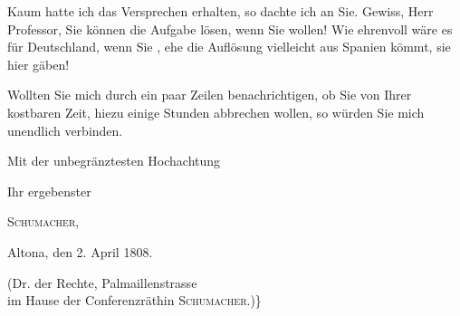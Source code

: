 \par\indent Kaum hatte ich das Versprechen erhalten, so dachte ich an Sie. Gewiss, Herr Professor, Sie können die Aufgabe lösen, wenn Sie wollen! Wie ehrenvoll wäre es für Deutschland, wenn Sie , ehe die Auflösung vielleicht aus Spanien kömmt, sie hier gäben!

\par\indent Wollten Sie mich durch ein paar Zeilen benachrichtigen, ob Sie von Ihrer kostbaren Zeit, hiezu einige Stunden abbrechen wollen, so würden Sie mich unendlich verbinden.
\par\indent Mit der unbegränztesten Hochachtung
\begin{flushright}
Ihr ergebenster\par\medskip
\textsc{Schumacher},
\end{flushright}
\noindent\begin{minipage}[t]{.40\linewidth}Altona, den 2. April 1808.\end{minipage}\hfill\begin{minipage}[t]{.58\linewidth}\raggedleft
(Dr. der Rechte, Palmaillenstrasse\\
im Hause der Conferenzräthin \textsc{Schumacher}.)\}
\end{minipage}
\clearpage
\endgroup
